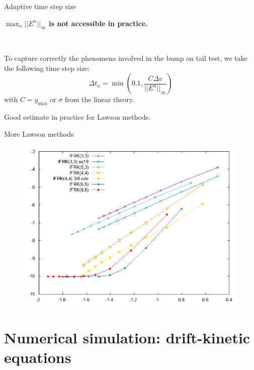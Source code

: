\documentclass{beamer}
\newcommand{\arrow}{{{\color{mblue}\ding{220}}}}
\newcommand{\mbold}[1]{\textbf{\color{mblue}#1}}
\begin{document}
\begin{frame}{Adaptive time step size}
  \centerline{\mbold{$\max_n||E^n||_\infty$ is not accessible in practice.}}

  \ 

  To capture correctly the phenomena involved in the bump on tail test, we take the following time step size:
  $$
    \Delta t_n = \min\left(0.1,\frac{C\Delta v}{||E^n||_\infty}\right)
  $$
  with $C=y_\text{max}$ or $\sigma$ from the linear theory.

  \arrow Good estimate in practice for Lawson methods.
\end{frame}
\begin{frame}{More Lawson methods}
    {
    \begin{figure}\centering
      \includegraphics[height=0.8\textheight]{img/oHdt.png}
    \end{figure}
  }
\end{frame}



\section{Numerical simulation: drift-kinetic equations}
\end{document}
